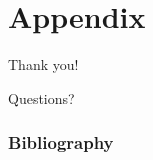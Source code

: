 \documentclass{beamer}
\begin{document}
\section*{Appendix}
\begin{frame}
\begin{block}{Thank you!}
\begin{center}
\Huge{Questions?}
\end{center}
\end{block}
\end{frame}

\frametitle{Bibliography}

%

\end{document}
